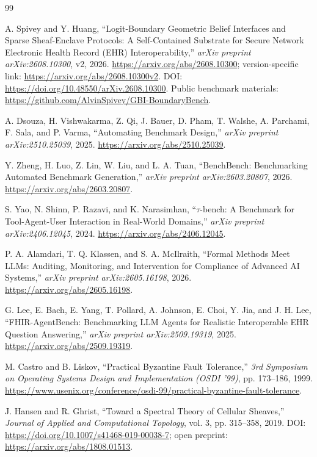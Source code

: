 \documentclass[11pt]{article}
\begin{document}
\newpage
\begin{thebibliography}{99}

A. Spivey and Y. Huang,
``Logit-Boundary Geometric Belief Interfaces and Sparse Sheaf-Enclave Protocols: A Self-Contained Substrate for Secure Network Electronic Health Record (EHR) Interoperability,''
\emph{arXiv preprint arXiv:2608.10300}, v2, 2026.
\url{https://arxiv.org/abs/2608.10300}; version-specific link: \url{https://arxiv.org/abs/2608.10300v2}. DOI: \url{https://doi.org/10.48550/arXiv.2608.10300}.
Public benchmark materials: \url{https://github.com/AlvinSpivey/GBI-BoundaryBench}.

A. Dsouza, H. Vishwakarma, Z. Qi, J. Bauer, D. Pham, T. Walshe, A. Parchami, F. Sala, and P. Varma,
``Automating Benchmark Design,''
\emph{arXiv preprint arXiv:2510.25039}, 2025.
\url{https://arxiv.org/abs/2510.25039}.

Y. Zheng, H. Luo, Z. Lin, W. Liu, and L. A. Tuan,
``BenchBench: Benchmarking Automated Benchmark Generation,''
\emph{arXiv preprint arXiv:2603.20807}, 2026.
\url{https://arxiv.org/abs/2603.20807}.

S. Yao, N. Shinn, P. Razavi, and K. Narasimhan,
``$\tau$-bench: A Benchmark for Tool-Agent-User Interaction in Real-World Domains,''
\emph{arXiv preprint arXiv:2406.12045}, 2024.
\url{https://arxiv.org/abs/2406.12045}.

P. A. Alamdari, T. Q. Klassen, and S. A. McIlraith,
``Formal Methods Meet LLMs: Auditing, Monitoring, and Intervention for Compliance of Advanced AI Systems,''
\emph{arXiv preprint arXiv:2605.16198}, 2026.
\url{https://arxiv.org/abs/2605.16198}.

G. Lee, E. Bach, E. Yang, T. Pollard, A. Johnson, E. Choi, Y. Jia, and J. H. Lee,
``FHIR-AgentBench: Benchmarking LLM Agents for Realistic Interoperable EHR Question Answering,''
\emph{arXiv preprint arXiv:2509.19319}, 2025.
\url{https://arxiv.org/abs/2509.19319}.

M. Castro and B. Liskov,
``Practical Byzantine Fault Tolerance,''
\emph{3rd Symposium on Operating Systems Design and Implementation (OSDI '99)}, pp. 173--186, 1999.
\url{https://www.usenix.org/conference/osdi-99/practical-byzantine-fault-tolerance}.

J. Hansen and R. Ghrist,
``Toward a Spectral Theory of Cellular Sheaves,''
\emph{Journal of Applied and Computational Topology}, vol. 3, pp. 315--358, 2019.
DOI: \url{https://doi.org/10.1007/s41468-019-00038-7}; open preprint: \url{https://arxiv.org/abs/1808.01513}.


\end{thebibliography}
\end{document}
